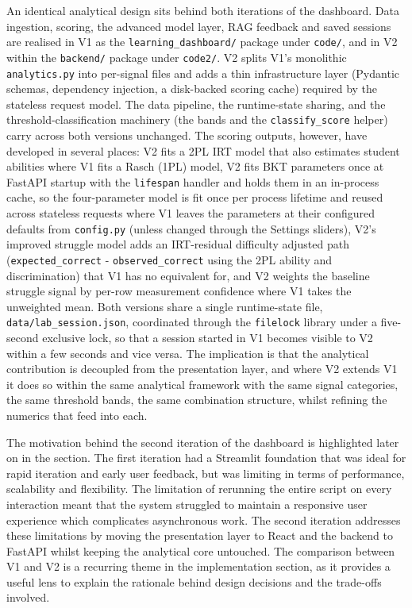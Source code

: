 An identical analytical design sits behind both iterations of the dashboard. 
Data ingestion, scoring, the advanced model layer, RAG feedback and saved sessions are realised in V1 as the \texttt{learning\_dashboard/} package under \texttt{code/}, and in V2 within the \texttt{backend/} package under \texttt{code2/}. V2 splits V1's monolithic \texttt{analytics.py} into per-signal files and adds a thin infrastructure layer (Pydantic schemas, dependency injection, a disk-backed scoring cache) required by the stateless request model. 
The data pipeline, the runtime-state sharing, and the threshold-classification machinery (the bands and the \texttt{classify\_score} helper) carry across both versions unchanged. 
The scoring outputs, however, have developed in several places: V2 fits a 2PL IRT model that also estimates student abilities where V1 fits a Rasch (1PL) model,
V2 fits BKT parameters once at FastAPI startup with the \texttt{lifespan} handler and holds them in an in-process cache, so the four-parameter model is fit once per process lifetime and reused across stateless requests where V1 leaves the parameters at their configured defaults from \texttt{config.py} (unless changed through the Settings sliders),
V2's improved struggle model adds an IRT-residual difficulty adjusted path (\texttt{expected\_correct} - \texttt{observed\_correct} using the 2PL ability and discrimination) that V1 has no equivalent for, and V2 weights the baseline struggle signal by per-row measurement confidence where V1 takes the unweighted mean. 
Both versions share a single runtime-state file, \texttt{data/lab\_session.json}, coordinated through the \texttt{filelock} library under a five-second exclusive lock, so that a session started in V1 becomes visible to V2 within a few seconds and vice versa. 
The implication is that the analytical contribution is decoupled from the presentation layer, and where V2 extends V1 it does so within the same analytical framework with the same signal categories, the same threshold bands, the same combination structure, whilst refining the numerics that feed into each.

The motivation behind the second iteration of the dashboard is highlighted later on in the section. The first iteration had a Streamlit foundation that was ideal for rapid iteration and early user feedback, but was limiting in terms of performance, scalability and flexibility. 
The limitation of rerunning the entire script on every interaction meant that the system struggled to maintain a responsive user experience which complicates asynchronous work. 
The second iteration addresses these limitations by moving the presentation layer to React and the backend to FastAPI whilst keeping the analytical core untouched. 
The comparison between V1 and V2 is a recurring theme in the implementation section, as it provides a useful lens to explain the rationale behind design decisions and the trade-offs involved. 

